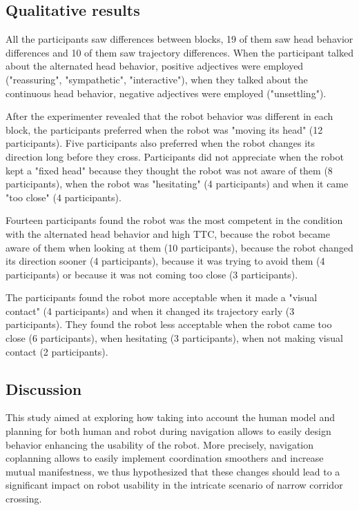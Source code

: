 \documentclass[a4paper,11pt,twoside]{StyleThese}
\begin{document}
\subsection{Qualitative results}
All the participants saw differences between blocks, 19 of them saw head behavior differences and 10 of them saw trajectory differences. When the participant talked about the alternated head behavior, positive adjectives were employed ("reassuring", "sympathetic", "interactive"), when they talked about the continuous head behavior, negative adjectives were employed ("unsettling").

After the experimenter revealed that the robot behavior was different in each block, the participants preferred when the robot was "moving its head" (12 participants). Five participants also preferred when the robot changes its direction long before they cross. Participants did not appreciate when the robot kept a "fixed head" because they thought the robot was not aware of them (8 participants), when the robot was "hesitating" (4 participants) and when it came "too close" (4 participants).

Fourteen participants found the robot was the most competent in the condition with the alternated head behavior and high TTC, because the robot became aware of them when looking at them (10 participants), because the robot changed its direction sooner (4 participants), because it was trying to avoid them (4 participants) or because it was not coming too close (3 participants).

The participants found the robot more acceptable when it made a "visual contact" (4 participants) and when it changed its trajectory early (3 participants). They found the robot less acceptable when the robot came too close (6 participants), when hesitating (3 participants), when not making visual contact (2 participants).


\subsection{Discussion}
This study aimed at exploring how taking into account the human model and planning for both human and robot during navigation allows to easily design behavior enhancing the usability of the robot. More precisely, navigation coplanning allows to easily implement coordination smoothers and increase mutual manifestness, we thus hypothesized that these changes should lead to a significant impact on robot usability in the intricate scenario of narrow corridor crossing.
\end{document}
